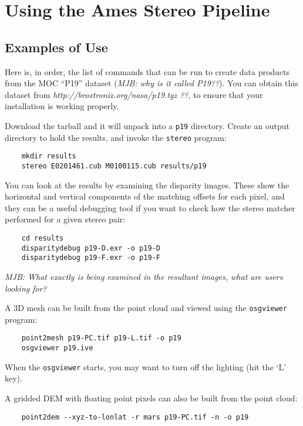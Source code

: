 \chapter{Using the Ames Stereo Pipeline}

\section{Examples of Use}

Here is, in order, the list of commands that can be run to create
data products from the MOC ``P19'' dataset (\emph{MJB: why is it
called P19??}).  You can obtain this dataset from
\emph{http://broxtronix.org/nasa/p19.tgz ??}, to ensure that your
installation is working properly.

Download the tarball and it will unpack into a \texttt{p19} directory.  Create an output directory to hold the results, and invoke the \texttt{stereo} program:

\begin{verbatim}
	mkdir results
	stereo E0201461.cub M0100115.cub results/p19
\end{verbatim}

You can look at the results by examining the disparity images. These
show the horizontal and vertical components of the matching offsets
for each pixel, and they can be a useful debugging tool if you want
to check how the stereo matcher performed for a given stereo pair:

\begin{verbatim}
	cd results
	disparitydebug p19-D.exr -o p19-D     
	disparitydebug p19-F.exr -o p19-F
\end{verbatim}

\emph{MJB: What exactly is being examined in the resultant images, what are users looking for?}

A 3D mesh can be built from the point cloud and viewed using the
\texttt{osgviewer} program:

\begin{verbatim}
	point2mesh p19-PC.tif p19-L.tif -o p19
	osgviewer p19.ive
\end{verbatim}

When the \texttt{osgviewer} starts, you may want to turn off the
lighting (hit the `L' key).

A gridded DEM with floating point pixels can also be built from the point cloud:

\begin{verbatim}
	point2dem --xyz-to-lonlat -r mars p19-PC.tif -n -o p19
\end{verbatim}

